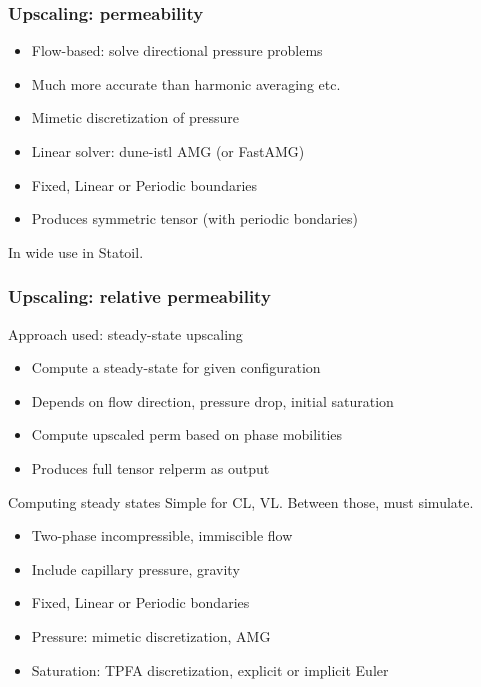 \documentclass[UKenglish,10pt]{beamer}
\begin{document}
\begin{frame}
  \frametitle{Upscaling: permeability}
  \begin{itemize}
  \item Flow-based: solve directional pressure problems
  \item Much more accurate than harmonic averaging etc.
  \item Mimetic discretization of pressure
  \item Linear solver: dune-istl AMG (or FastAMG)
  \item Fixed, Linear or Periodic boundaries
  \item Produces symmetric tensor (with periodic bondaries)
  \end{itemize}
  \bigskip

  In wide use in Statoil.
\end{frame}



\begin{frame}
  \frametitle{Upscaling: relative permeability}
  \begin{block}{Approach used: steady-state upscaling}
    \begin{itemize}
    \item Compute a steady-state for given configuration
    \item Depends on flow direction, pressure drop, initial saturation
    \item Compute upscaled perm based on phase mobilities
    \item Produces full tensor relperm as output
    \end{itemize}
  \end{block}

  \begin{block}{Computing steady states}
    Simple for CL, VL. Between those, must simulate.
    \begin{itemize}
    \item Two-phase incompressible, immiscible flow
    \item Include capillary pressure, gravity
    \item Fixed, Linear or Periodic bondaries
    \item Pressure: mimetic discretization, AMG
    \item Saturation: TPFA discretization, explicit or implicit Euler
  \end{itemize}
  \end{block}
\end{frame}
\end{document}
